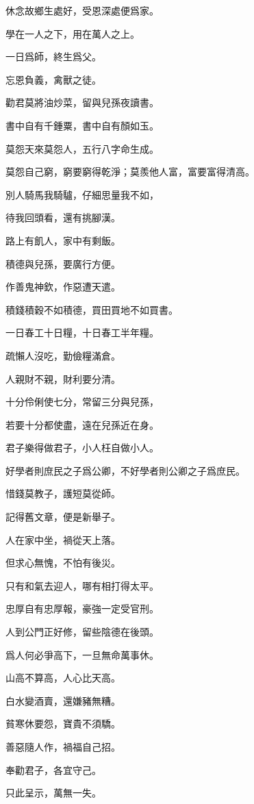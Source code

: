 \documentclass[12pt,a4paper]{ctexbook}
\begin{document}
休念故鄉生處好，受恩深處便爲家。\par
學在一人之下，用在萬人之上。\par
一日爲師，終生爲父。\par
忘恩負義，禽獸之徒。\par
勸君莫將油炒菜，留與兒孫夜讀書。\par
書中自有千鍾粟，書中自有顏如玉。\par
莫怨天來莫怨人，五行八字命生成。\par
莫怨自己窮，窮要窮得乾淨；莫羨他人富，富要富得清高。\par
別人騎馬我騎驢，仔細思量我不如，\par
待我回頭看，還有挑腳漢。\par
路上有飢人，家中有剩飯。\par
積德與兒孫，要廣行方便。\par
作善鬼神欽，作惡遭天遣。\par
積錢積穀不如積德，買田買地不如買書。\par
一日春工十日糧，十日春工半年糧。\par
疏懶人沒吃，勤儉糧滿倉。\par
人親財不親，財利要分清。\par
十分伶俐使七分，常留三分與兒孫，\par
若要十分都使盡，遠在兒孫近在身。\par
君子樂得做君子，小人枉自做小人。\par
好學者則庶民之子爲公卿，不好學者則公卿之子爲庶民。\par
惜錢莫教子，護短莫從師。\par
記得舊文章，便是新舉子。\par
人在家中坐，禍從天上落。\par
但求心無愧，不怕有後災。\par
只有和氣去迎人，哪有相打得太平。\par
忠厚自有忠厚報，豪強一定受官刑。\par
人到公門正好修，留些陰德在後頭。\par
爲人何必爭高下，一旦無命萬事休。\par
山高不算高，人心比天高。\par
白水變酒賣，還嫌豬無糟。\par
貧寒休要怨，寶貴不須驕。\par
善惡隨人作，禍福自己招。\par
奉勸君子，各宜守己。\par
只此呈示，萬無一失。\par
\end{document}
